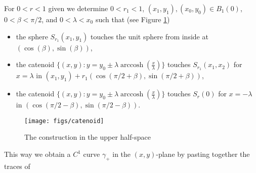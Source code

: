 \documentclass[reqno,makeidx,12pt]{amsart}
\theoremstyle{note}
\theoremstyle{definition}
\begin{document}
For $0<r<1$ given we determine
$0<r_1<1$, $(x_1,y_1), (x_0,y_0)\in B_1(0)$, $0<\beta<\pi/2$, and
$0<\lambda<x_0$ 
such that (see Figure \ref{fig:const})
\begin{itemize}
\item
the sphere $S_{r_1}(x_1,y_1)$ touches the unit sphere from
inside at $(\cos(\beta),\sin(\beta))$,
\item
the catenoid $\{(x,y): y = y_0 \pm \lambda \operatorname{arccosh}(\frac{x}{\lambda})\}$
touches $S_{r_1}(x_1,x_2)$ for $x=\lambda$ in
$(x_1,y_1)+r_1(\cos(\pi/2+\beta),\sin(\pi/2+\beta))$,
\item
the catenoid $\{(x,y): y = y_0 \pm \lambda \operatorname{arccosh}(\frac{x}{\lambda})\}$
touches $S_r(0)$ for $x=-\lambda$ in $(\cos(\pi/2-\beta),\sin(\pi/2-\beta))$.
\end{itemize}
\begin{figure}[h]
  \texttt{[image: figs/catenoid]}
  \caption{The construction in the upper half-space}
  \label{fig:const}
\end{figure}
This way we obtain a $C^1$ curve $\gamma_+$ in the $(x,y)$-plane by
pasting together the traces of
\end{document}
